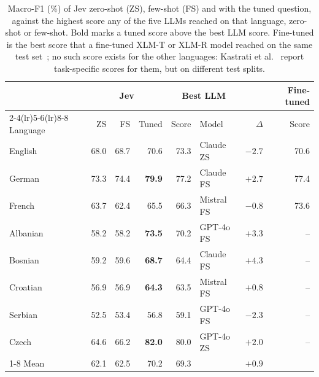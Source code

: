 \begin{table}[t]
\centering
\caption{Macro-F1 (\%) of Jev zero-shot (ZS), few-shot (FS) and with the tuned question, against the highest score any of the five LLMs reached on that language, zero-shot or few-shot. Bold marks a tuned score above the best LLM score. Fine-tuned is the best score that a fine-tuned XLM-T or XLM-R model reached on the same test set~\cite{barbieri2022xlmt}; no such score exists for the other languages: Kastrati et al.~\cite{kastrati2026language} report task-specific scores for them, but on different test splits.}
\label{tab:tuned}
\setlength{\tabcolsep}{2.5pt}
\begin{tabular}{@{}lrrrrlrr@{}}
\toprule
 & \multicolumn{3}{c}{Jev} & \multicolumn{2}{c}{Best LLM} & & Fine-tuned \\
\cmidrule(lr){2-4}\cmidrule(lr){5-6}\cmidrule(lr){8-8}
Language & ZS & FS & Tuned & Score & Model & $\Delta$ & Score \\
\midrule
English & 68.0 & 68.7 & 70.6 & 73.3 & Claude ZS & $-2.7$ & 70.6 \\
German & 73.3 & 74.4 & \textbf{79.9} & 77.2 & Claude FS & $+2.7$ & 77.4 \\
French & 63.7 & 62.4 & 65.5 & 66.3 & Mistral FS & $-0.8$ & 73.6 \\
Albanian & 58.2 & 58.2 & \textbf{73.5} & 70.2 & GPT-4o FS & $+3.3$ & -- \\
Bosnian & 59.2 & 59.6 & \textbf{68.7} & 64.4 & Claude FS & $+4.3$ & -- \\
Croatian & 56.9 & 56.9 & \textbf{64.3} & 63.5 & Mistral FS & $+0.8$ & -- \\
Serbian & 52.5 & 53.4 & 56.8 & 59.1 & GPT-4o FS & $-2.3$ & -- \\
Czech & 64.6 & 66.2 & \textbf{82.0} & 80.0 & GPT-4o ZS & $+2.0$ & -- \\
\cmidrule{1-8}
Mean & 62.1 & 62.5 & 70.2 & 69.3 & & $+0.9$ & \\
\bottomrule
\end{tabular}
\end{table}
